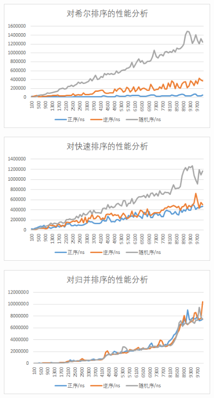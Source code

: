 \documentclass[UTF8]{ctexart}
\begin{document}
        \begin{figure}[H]
          \includegraphics[width=\textwidth]{shellsort}
          \centering
        \end{figure}
        \begin{figure}[H]
          \includegraphics[width=\textwidth]{quicksort}
          \centering
        \end{figure}
        \begin{figure}[H]
          \includegraphics[width=\textwidth]{mergesort}
          \centering
        \end{figure}
\end{document}
